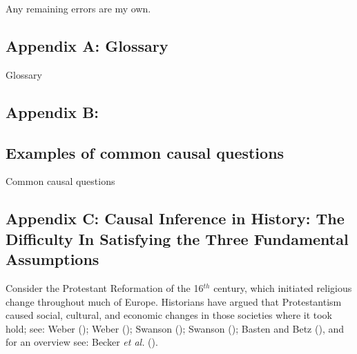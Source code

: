 \documentclass[
  single column]{article}
\begin{document}
Any remaining errors are my own.

\newpage{}

\subsection{Appendix A: Glossary}\label{appendix-a-glossary}

\begin{table}

\caption{\label{tbl-experiments}Glossary}

\centering{

\glossaryTerms

}

\end{table}%

\subsection{Appendix B:}\label{appendix-b}

\subsection{Examples of common causal
questions}\label{examples-of-common-causal-questions}

\begin{table}

\caption{\label{tbl-common-interests}Common causal questions}

\centering{

\terminologycommoncausalinterests

}

\end{table}%

\subsection{Appendix C: Causal Inference in History: The Difficulty In
Satisfying the Three Fundamental
Assumptions}\label{appendix-c-causal-inference-in-history-the-difficulty-in-satisfying-the-three-fundamental-assumptions}

Consider the Protestant Reformation of the 16\(^{th}\) century, which
initiated religious change throughout much of Europe. Historians have
argued that Protestantism caused social, cultural, and economic changes
in those societies where it took hold; see: Weber
(); Weber
(); Swanson
(); Swanson
(); Basten and Betz
(), and for an overview see: Becker
\emph{et al.} ().
\end{document}
